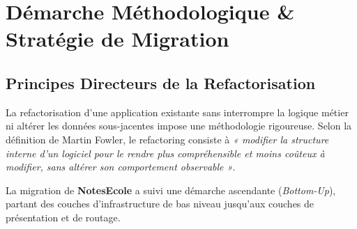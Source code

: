 \documentclass[11pt,a4paper,oneside]{report}
\begin{document}
\chapter{Démarche Méthodologique \& Stratégie de Migration}
\label{chap:strategie}

\section{Principes Directeurs de la Refactorisation}

La refactorisation d'une application existante sans interrompre la logique métier ni altérer les données sous-jacentes impose une méthodologie rigoureuse. Selon la définition de Martin Fowler, le refactoring consiste à \textit{« modifier la structure interne d'un logiciel pour le rendre plus compréhensible et moins coûteux à modifier, sans altérer son comportement observable »}.

La migration de \textbf{NotesEcole} a suivi une démarche ascendante (\textit{Bottom-Up}), partant des couches d'infrastructure de bas niveau jusqu'aux couches de présentation et de routage.
\end{document}
